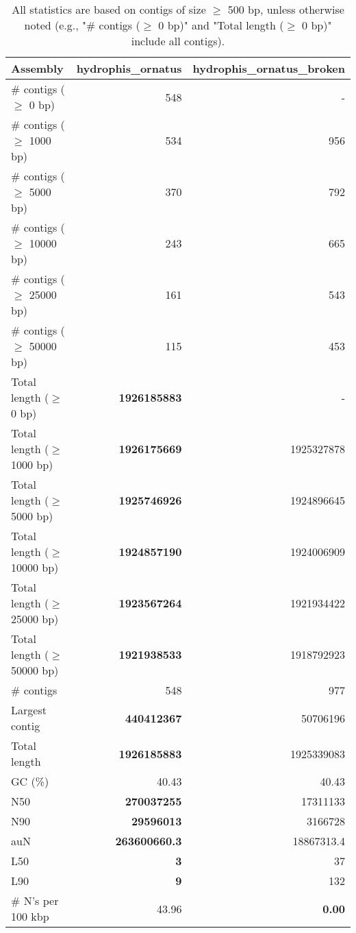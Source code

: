 \documentclass[12pt,a4paper]{article}
\begin{document}
\begin{table}[ht]
\begin{center}
\caption{All statistics are based on contigs of size $\geq$ 500 bp, unless otherwise noted (e.g., "\# contigs ($\geq$ 0 bp)" and "Total length ($\geq$ 0 bp)" include all contigs).}
\begin{tabular}{|l*{2}{|r}|}
\hline
Assembly & hydrophis\_ornatus & hydrophis\_ornatus\_broken \\ \hline
\# contigs ($\geq$ 0 bp) & 548 & - \\ \hline
\# contigs ($\geq$ 1000 bp) & 534 & 956 \\ \hline
\# contigs ($\geq$ 5000 bp) & 370 & 792 \\ \hline
\# contigs ($\geq$ 10000 bp) & 243 & 665 \\ \hline
\# contigs ($\geq$ 25000 bp) & 161 & 543 \\ \hline
\# contigs ($\geq$ 50000 bp) & 115 & 453 \\ \hline
Total length ($\geq$ 0 bp) & {\bf 1926185883} & - \\ \hline
Total length ($\geq$ 1000 bp) & {\bf 1926175669} & 1925327878 \\ \hline
Total length ($\geq$ 5000 bp) & {\bf 1925746926} & 1924896645 \\ \hline
Total length ($\geq$ 10000 bp) & {\bf 1924857190} & 1924006909 \\ \hline
Total length ($\geq$ 25000 bp) & {\bf 1923567264} & 1921934422 \\ \hline
Total length ($\geq$ 50000 bp) & {\bf 1921938533} & 1918792923 \\ \hline
\# contigs & 548 & 977 \\ \hline
Largest contig & {\bf 440412367} & 50706196 \\ \hline
Total length & {\bf 1926185883} & 1925339083 \\ \hline
GC (\%) & 40.43 & 40.43 \\ \hline
N50 & {\bf 270037255} & 17311133 \\ \hline
N90 & {\bf 29596013} & 3166728 \\ \hline
auN & {\bf 263600660.3} & 18867313.4 \\ \hline
L50 & {\bf 3} & 37 \\ \hline
L90 & {\bf 9} & 132 \\ \hline
\# N's per 100 kbp & 43.96 & {\bf 0.00} \\ \hline
\end{tabular}
\end{center}
\end{table}
\end{document}
